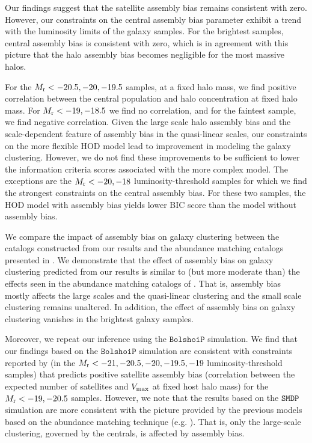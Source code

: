 \documentclass[12pt, preprint]{aastex}
\begin{document}
Our findings suggest that the satellite assembly bias remains consistent with zero. However, our constraints on the central assembly bias parameter exhibit a trend with the luminosity limits of the galaxy samples. For the brightest samples, central assembly bias is consistent with zero, which is in agreement with this picture that the halo assembly bias becomes negligible for the most massive halos. 

For the $M_{\rm r}<-20.5, -20, -19.5$ samples, at a fixed halo mass, we find positive correlation between the central population and halo concentration at fixed halo mass. For $M_{\rm r}<-19, -18.5$ we find no correlation, and for the faintest sample, we find negative correlation. Given the large scale halo assembly bias and the scale-dependent feature of assembly bias in the quasi-linear scales, our constraints on the more flexible HOD model lead to improvement in modeling the galaxy clustering. However, we do not find these improvements to be sufficient to lower the information criteria scores associated with the more complex model. The exceptions are the $M_{\rm r}<-20,-18$ luminosity-threshold samples for which we find the strongest constraints on the central assembly bias. For these two samples, the HOD model with assembly bias yields lower BIC score than the model without assembly bias.

We compare the impact of assembly bias on galaxy clustering between the catalogs constructed from our results and the abundance matching catalogs presented in \citet{hw2013,arz2014}. We demonstrate that the effect of assembly bias on galaxy clustering predicted from our results is similar to (but more moderate than) the effects seen in the abundance matching catalogs of \citet{hw2013}. That is, assembly bias mostly affects the large scales and the quasi-linear clustering and the small scale clustering remains unaltered. In addition, the effect of assembly bias on galaxy clustering vanishes in the brightest galaxy samples.

Moreover, we repeat our inference using the $\mathtt{BolshoiP}$ simulation. 
We find that our findings based on the $\mathtt{BolshoiP}$ simulation are consistent with constraints reported by \citet{zentner2016} (in the $M_{\rm r}<-21, -20.5, -20, -19.5, -19$ luminosity-threshold samples) that predicts positive satellite assembly bias (correlation between the expected number of satellites and $V_{\rm max}$ at fixed host halo mass) for the $M_{\rm r}<-19, -20.5$ samples. However, we note that the results based on the $\mathtt{SMDP}$ simulation are more consistent with the picture provided by the previous models based on the abundance matching technique (e.g. \citealt{arz2014,lehman2015}). That is, only the large-scale clustering, governed by the centrals, is affected by assembly bias.
\end{document}
